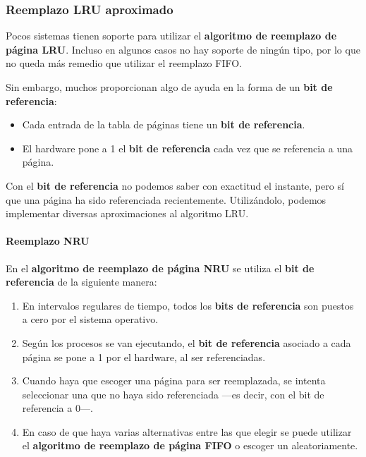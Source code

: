 \subsubsection{Reemplazo LRU
aproximado}\label{_reemplazo_lru_aproximado}

Pocos sistemas tienen soporte para utilizar el \textbf{algoritmo de
reemplazo de página LRU}. Incluso en algunos casos no hay soporte de
ningún tipo, por lo que no queda más remedio que utilizar el reemplazo
FIFO.

Sin embargo, muchos proporcionan algo de ayuda en la forma de un
\textbf{bit de referencia}{}:

\begin{itemize}
\item
  Cada entrada de la tabla de páginas tiene un \textbf{bit de
  referencia}.
\item
  El hardware pone a 1 el \textbf{bit de referencia} cada vez que se
  referencia a una página.
\end{itemize}

Con el \textbf{bit de referencia} no podemos saber con exactitud el
instante, pero sí que una página ha sido referenciada recientemente.
Utilizándolo, podemos implementar diversas aproximaciones al algoritmo
LRU.

\paragraph{Reemplazo NRU}\label{_reemplazo_nru}

{} {} En el \textbf{algoritmo de reemplazo de página {}NRU} se utiliza
el \textbf{bit de referencia} de la siguiente manera:

\begin{enumerate}
\def\labelenumi{\arabic{enumi}.}
\item
  En intervalos regulares de tiempo, todos los \textbf{bits de
  referencia} son puestos a cero por el sistema operativo.
\item
  Según los procesos se van ejecutando, el \textbf{bit de referencia}
  asociado a cada página se pone a 1 por el hardware, al ser
  referenciadas.
\item
  Cuando haya que escoger una página para ser reemplazada, se intenta
  seleccionar una que no haya sido referenciada ---es decir, con el bit
  de referencia a 0---.
\item
  En caso de que haya varias alternativas entre las que elegir se puede
  utilizar el \textbf{algoritmo de reemplazo de página FIFO} o escoger
  un aleatoriamente.
\end{enumerate}

